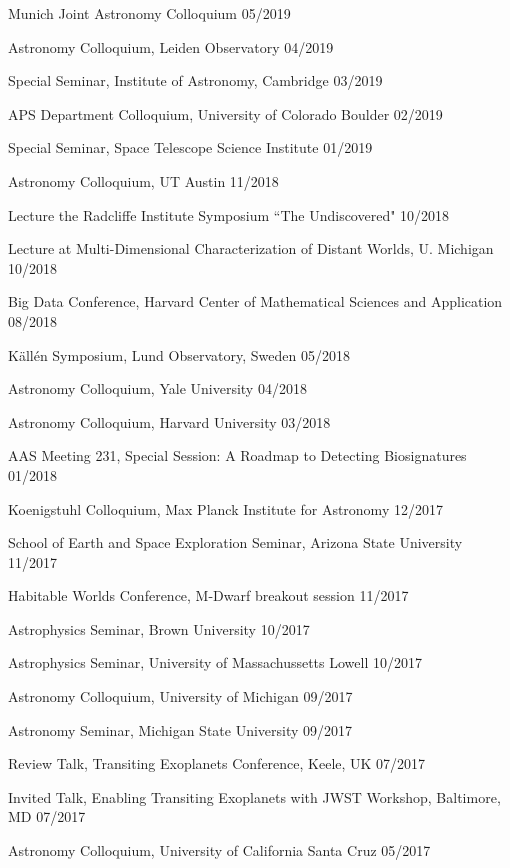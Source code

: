 \documentclass[12pt,letterpaper]{article}
\begin{document}
\begin{list}{}{\cvlist}
\item {Munich Joint Astronomy Colloquium \hfill 05/2019}
\item {Astronomy Colloquium, Leiden Observatory \hfill 04/2019}
\item {Special Seminar, Institute of Astronomy, Cambridge \hfill 03/2019}
\item {APS Department Colloquium, University of Colorado Boulder \hfill 02/2019}
\item {Special Seminar, Space Telescope Science Institute \hfill 01/2019}
\item {Astronomy Colloquium, UT Austin \hfill 11/2018}
\item {Lecture the Radcliffe Institute Symposium ``The Undiscovered" \hfill 10/2018}
\item {Lecture at Multi-Dimensional Characterization of Distant Worlds, U. Michigan \hfill 10/2018}
\item {Big Data Conference, Harvard Center of Mathematical Sciences and Application \hfill 08/2018}
\item {K\"{a}ll\'{e}n Symposium, Lund Observatory, Sweden \hfill 05/2018}
\item {Astronomy Colloquium, Yale University \hfill 04/2018}
\item{Astronomy Colloquium, Harvard University \hfill 03/2018}
\item {AAS Meeting 231, Special Session: A Roadmap to Detecting Biosignatures \hfill 01/2018}
\item {Koenigstuhl Colloquium, Max Planck Institute for Astronomy \hfill 12/2017}
\item {School of Earth and Space Exploration Seminar, Arizona State University \hfill 11/2017}
\item {Habitable Worlds Conference, M-Dwarf breakout session \hfill 11/2017}
\item {Astrophysics Seminar, Brown University \hfill 10/2017}
\item {Astrophysics Seminar, University of Massachussetts Lowell \hfill 10/2017}
\item {Astronomy Colloquium, University of Michigan \hfill 09/2017}
\item {Astronomy Seminar, Michigan State University \hfill 09/2017}
\item {Review Talk, Transiting Exoplanets Conference, Keele, UK \hfill 07/2017}
\item {Invited Talk, Enabling Transiting Exoplanets with JWST Workshop, Baltimore, MD \hfill 07/2017}
\item {Astronomy Colloquium, University of California Santa Cruz \hfill 05/2017}

\end{list}
\end{document}
